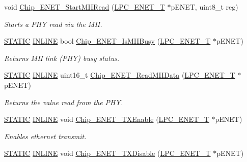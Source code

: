 \begin{DoxyCompactItemize}
void \hyperlink{group___e_n_e_t__18_x_x__43_x_x_gaca2166605d385fd5150f173cd33a3ac2}{Chip\+\_\+\+E\+N\+E\+T\+\_\+\+Start\+M\+I\+I\+Read} (\hyperlink{struct_l_p_c___e_n_e_t___t}{L\+P\+C\+\_\+\+E\+N\+E\+T\+\_\+T} $\ast$p\+E\+N\+ET, uint8\+\_\+t reg)
\begin{DoxyCompactList}\small\item\em Starts a P\+HY read via the M\+II. \end{DoxyCompactList}\item 
\hyperlink{group___l_p_c___types___public___macros_ga10b2d890d871e1489bb02b7e70d9bdfb}{S\+T\+A\+T\+IC} \hyperlink{spifi__18xx__43xx_8h_a2eb6f9e0395b47b8d5e3eeae4fe0c116}{I\+N\+L\+I\+NE} bool \hyperlink{group___e_n_e_t__18_x_x__43_x_x_ga2ae5389a2b99d6006980083d02667e07}{Chip\+\_\+\+E\+N\+E\+T\+\_\+\+Is\+M\+I\+I\+Busy} (\hyperlink{struct_l_p_c___e_n_e_t___t}{L\+P\+C\+\_\+\+E\+N\+E\+T\+\_\+T} $\ast$p\+E\+N\+ET)
\begin{DoxyCompactList}\small\item\em Returns M\+II link (P\+HY) busy status. \end{DoxyCompactList}\item 
\hyperlink{group___l_p_c___types___public___macros_ga10b2d890d871e1489bb02b7e70d9bdfb}{S\+T\+A\+T\+IC} \hyperlink{spifi__18xx__43xx_8h_a2eb6f9e0395b47b8d5e3eeae4fe0c116}{I\+N\+L\+I\+NE} uint16\+\_\+t \hyperlink{group___e_n_e_t__18_x_x__43_x_x_ga47f1d10185cb9ed0c484c9fd3ac07423}{Chip\+\_\+\+E\+N\+E\+T\+\_\+\+Read\+M\+I\+I\+Data} (\hyperlink{struct_l_p_c___e_n_e_t___t}{L\+P\+C\+\_\+\+E\+N\+E\+T\+\_\+T} $\ast$p\+E\+N\+ET)
\begin{DoxyCompactList}\small\item\em Returns the value read from the P\+HY. \end{DoxyCompactList}\item 
\hyperlink{group___l_p_c___types___public___macros_ga10b2d890d871e1489bb02b7e70d9bdfb}{S\+T\+A\+T\+IC} \hyperlink{spifi__18xx__43xx_8h_a2eb6f9e0395b47b8d5e3eeae4fe0c116}{I\+N\+L\+I\+NE} void \hyperlink{group___e_n_e_t__18_x_x__43_x_x_gacc7e455d4b168d2405b4ef9dda242488}{Chip\+\_\+\+E\+N\+E\+T\+\_\+\+T\+X\+Enable} (\hyperlink{struct_l_p_c___e_n_e_t___t}{L\+P\+C\+\_\+\+E\+N\+E\+T\+\_\+T} $\ast$p\+E\+N\+ET)
\begin{DoxyCompactList}\small\item\em Enables ethernet transmit. \end{DoxyCompactList}\item 
\hyperlink{group___l_p_c___types___public___macros_ga10b2d890d871e1489bb02b7e70d9bdfb}{S\+T\+A\+T\+IC} \hyperlink{spifi__18xx__43xx_8h_a2eb6f9e0395b47b8d5e3eeae4fe0c116}{I\+N\+L\+I\+NE} void \hyperlink{group___e_n_e_t__18_x_x__43_x_x_gaaf0d9ef785afa5a847431e86520430c9}{Chip\+\_\+\+E\+N\+E\+T\+\_\+\+T\+X\+Disable} (\hyperlink{struct_l_p_c___e_n_e_t___t}{L\+P\+C\+\_\+\+E\+N\+E\+T\+\_\+T} $\ast$p\+E\+N\+ET)

\end{DoxyCompactItemize}
